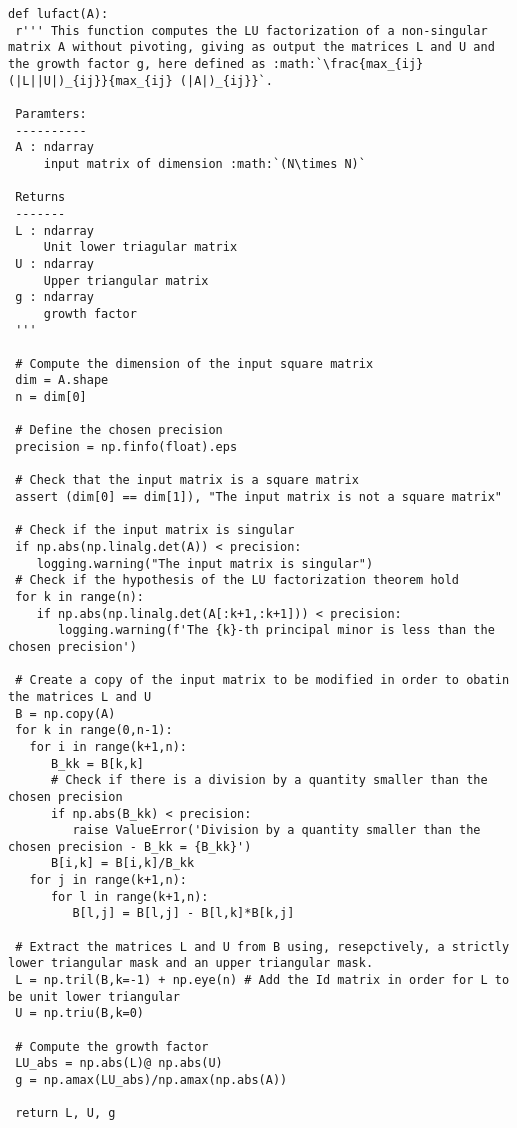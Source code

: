 \documentclass[a4paper,11pt]{report}
\begin{document}
\begin{verbatim}
def lufact(A):
 r''' This function computes the LU factorization of a non-singular matrix A without pivoting, giving as output the matrices L and U and the growth factor g, here defined as :math:`\frac{max_{ij} (|L||U|)_{ij}}{max_{ij} (|A|)_{ij}}`.

 Paramters:
 ----------
 A : ndarray
     input matrix of dimension :math:`(N\times N)`
	
 Returns
 -------
 L : ndarray
     Unit lower triagular matrix
 U : ndarray
     Upper triangular matrix
 g : ndarray
     growth factor
 '''

 # Compute the dimension of the input square matrix
 dim = A.shape
 n = dim[0]

 # Define the chosen precision
 precision = np.finfo(float).eps

 # Check that the input matrix is a square matrix
 assert (dim[0] == dim[1]), "The input matrix is not a square matrix"

 # Check if the input matrix is singular
 if np.abs(np.linalg.det(A)) < precision:
    logging.warning("The input matrix is singular")
 # Check if the hypothesis of the LU factorization theorem hold
 for k in range(n):
    if np.abs(np.linalg.det(A[:k+1,:k+1])) < precision:
	   logging.warning(f'The {k}-th principal minor is less than the chosen precision')

 # Create a copy of the input matrix to be modified in order to obatin the matrices L and U
 B = np.copy(A)
 for k in range(0,n-1):
   for i in range(k+1,n):
      B_kk = B[k,k]
      # Check if there is a division by a quantity smaller than the chosen precision
      if np.abs(B_kk) < precision:
         raise ValueError('Division by a quantity smaller than the chosen precision - B_kk = {B_kk}')
      B[i,k] = B[i,k]/B_kk
   for j in range(k+1,n):
      for l in range(k+1,n):
         B[l,j] = B[l,j] - B[l,k]*B[k,j]

 # Extract the matrices L and U from B using, resepctively, a strictly lower triangular mask and an upper triangular mask.
 L = np.tril(B,k=-1) + np.eye(n) # Add the Id matrix in order for L to be unit lower triangular
 U = np.triu(B,k=0)  

 # Compute the growth factor
 LU_abs = np.abs(L)@ np.abs(U)
 g = np.amax(LU_abs)/np.amax(np.abs(A))

 return L, U, g
\end{verbatim}
\end{document}
